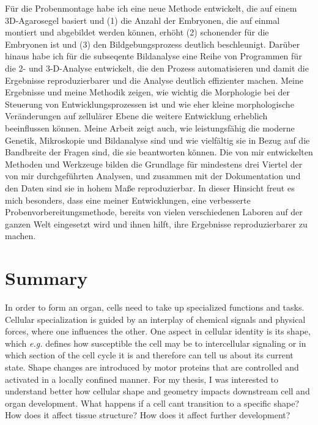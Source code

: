 \documentclass[10pt, b5paper, singlespacinge, twoside]{reedthesis} %
\theoremstyle{definition}
\theoremstyle{definition}
\theoremstyle{definition}
\theoremstyle{remark}
\begin{document}
Für die Probenmontage habe ich eine neue Methode entwickelt, die auf einem 3D-Agarosegel basiert und (1) die Anzahl der Embryonen, die auf einmal montiert und abgebildet werden können, erhöht (2) schonender für die Embryonen ist und (3) den Bildgebungsprozess deutlich beschleunigt. Darüber hinaus habe ich für die subseqente Bildanalyse eine Reihe von Programmen für die 2- und 3-D-Analyse entwickelt, die den Prozess automatisieren und damit die Ergebnisse reproduzierbarer und die Analyse deutlich effizienter machen. Meine Ergebnisse und meine Methodik zeigen, wie wichtig die Morphologie bei der Steuerung von Entwicklungsprozessen ist und wie eher kleine morphologische Veränderungen auf zellulärer Ebene die weitere Entwicklung erheblich beeinflussen können. Meine Arbeit zeigt auch, wie leistungsfähig die moderne Genetik, Mikroskopie und Bildanalyse sind und wie vielfältig sie in Bezug auf die Bandbreite der Fragen sind, die sie beantworten können. Die von mir entwickelten Methoden und Werkzeuge bilden die Grundlage für mindestens drei Viertel der von mir durchgeführten Analysen, und zusammen mit der Dokumentation und den Daten sind sie in hohem Maße reproduzierbar. In dieser Hinsicht freut es mich besonders, dass eine meiner Entwicklungen, eine verbesserte Probenvorbereitungsmethode, bereits von vielen verschiedenen Laboren auf der ganzen Welt eingesetzt wird und ihnen hilft, ihre Ergebnisse reproduzierbarer zu machen.

\hypertarget{summary}{%
\chapter*{Summary}\label{summary}}

In order to form an organ, cells need to take up specialized functions and tasks. Cellular specialization is guided by an interplay of chemical signals and physical forces, where one influences the other. One aspect in cellular identity is its shape, which \emph{e.g.} defines how susceptible the cell may be to intercellular signaling or in which section of the cell cycle it is and therefore can tell us about its current state. Shape changes are introduced by motor proteins that are controlled and activated in a locally confined manner. For my thesis, I was interested to understand better how cellular shape and geometry impacts downstream cell and organ development. What happens if a cell cant transition to a specific shape? How does it affect tissue structure? How does it affect further development?
\end{document}
